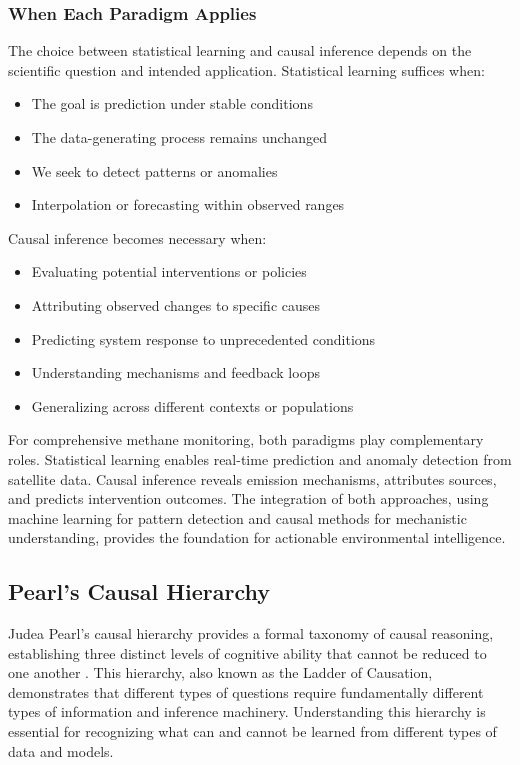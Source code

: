 \subsubsection{When Each Paradigm Applies}

The choice between statistical learning and causal inference depends on the scientific question and intended application. Statistical learning suffices when:
\begin{itemize}
\item The goal is prediction under stable conditions
\item The data-generating process remains unchanged
\item We seek to detect patterns or anomalies
\item Interpolation or forecasting within observed ranges
\end{itemize}

Causal inference becomes necessary when:
\begin{itemize}
\item Evaluating potential interventions or policies
\item Attributing observed changes to specific causes
\item Predicting system response to unprecedented conditions
\item Understanding mechanisms and feedback loops
\item Generalizing across different contexts or populations
\end{itemize}

For comprehensive methane monitoring, both paradigms play complementary roles. Statistical learning enables real-time prediction and anomaly detection from satellite data. Causal inference reveals emission mechanisms, attributes sources, and predicts intervention outcomes. The integration of both approaches, using machine learning for pattern detection and causal methods for mechanistic understanding, provides the foundation for actionable environmental intelligence.

\subsection{Pearl's Causal Hierarchy}

Judea Pearl's causal hierarchy provides a formal taxonomy of causal reasoning, establishing three distinct levels of cognitive ability that cannot be reduced to one another \cite{Pearl2009}. This hierarchy, also known as the Ladder of Causation, demonstrates that different types of questions require fundamentally different types of information and inference machinery. Understanding this hierarchy is essential for recognizing what can and cannot be learned from different types of data and models.

